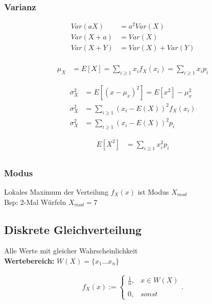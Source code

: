 \documentclass[10pt,a4paper]{article}
\begin{document}
\subsubsection{Varianz}
  \begin{mdframed}[style=exercise]
    \begin{align}
        Var(aX) &= a^2 Var(X) \\
        Var(X + a) &= Var(X)  \\
        Var(X + Y) &=  Var(X) + Var(Y)\\
    \end{align}
  \end{mdframed}

  \begin{mdframed}[style=exercise]
    \begin{align}
        \mu_X &= E[X] = \sum_{i \geq 1} x_i f_X(x_i) = \sum_{i \geq 1} x_i p_i
    \end{align}
  \end{mdframed}

  \begin{mdframed}[style=exercise]
    \begin{align}
        \sigma_X^2 &= E[(x-\mu_x)^2] = E[x^2]-\mu_x^2 \\ 
        \sigma_X^2 &= \sum_{i \geq 1} (x_i -E(X))^2 f_X(x_i) \\
        \sigma_X^2 &= \sum_{i \geq 1} (x_i -E(X))^2 p_i
    \end{align}
  \end{mdframed}

  \begin{mdframed}[style=exercise]
    \begin{align}
        E[X^2] &= \sum_{i \geq 1} x_i^2 p_i\\
    \end{align}
  \end{mdframed}

\subsubsection{Modus}
Lokales Maximum der Verteilung $f_X(x)$ ist Modus $X_{mod}$ \\
Bsp: 2-Mal Würfeln $X_{mod} = 7$

\subsection{Diskrete Gleichverteilung}
Alle Werte mit gleicher Wahrscheinlichkeit \\
\textbf{Wertebereich:} $W(X)= \{x_1 ... x_n \}$
  \begin{mdframed}[style=exercise]
    \begin{align}
        f_X(x):=\left\{\begin{array}{ll} \frac{1}{n},  & x \in W(X) \\ \\
         0, & sonst\end{array}\right. .
    \end{align}
  \end{mdframed}
\end{document}
